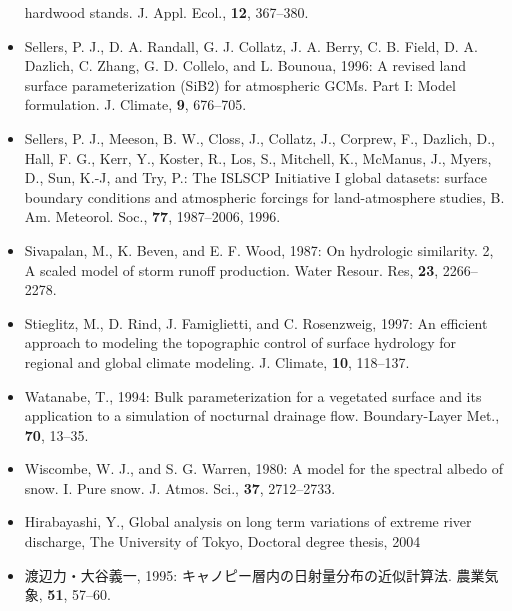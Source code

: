 \begin{itemize}
  hardwood stands. {J. Appl. Ecol.}, {\textbf{12}}, 367--380.
\item
  Sellers, P. J., D. A. Randall, G. J. Collatz, J. A. Berry, C. B. Field, D. A. Dazlich, C. Zhang, G. D. Collelo, and L. Bounoua, 1996: A revised land surface parameterization (SiB2) for atmospheric
  GCMs. Part I: Model formulation. {J. Climate}, {\textbf{9}}, 676--705.
\item
  Sellers, P. J., Meeson, B. W., Closs, J., Collatz, J., Corprew, F., Dazlich, D., Hall, F. G., Kerr, Y., Koster, R., Los, S., Mitchell, K., McManus, J., Myers, D., Sun, K.-J, and Try, P.: The ISLSCP
  Initiative I global datasets: surface boundary conditions and atmospheric forcings for land-atmosphere studies, B. Am. Meteorol. Soc., {\textbf{77}}, 1987--2006, 1996.
\item
  Sivapalan, M., K. Beven, and E. F. Wood, 1987: On hydrologic similarity. 2, A scaled model of storm runoff production. {Water Resour. Res}, {\textbf{23}}, 2266--2278.
\item
  Stieglitz, M., D. Rind, J. Famiglietti, and C. Rosenzweig, 1997: An efficient approach to modeling the topographic control of surface hydrology for regional and global climate modeling. {J.
  Climate}, {\textbf{10}}, 118--137.
\item
  Watanabe, T., 1994: Bulk parameterization for a vegetated surface and its application to a simulation of nocturnal drainage flow. {Boundary-Layer Met.}, {\textbf{70}}, 13--35.
\item
  Wiscombe, W. J., and S. G. Warren, 1980: A model for the spectral albedo of snow. I. Pure snow. {J. Atmos. Sci.}, {\textbf{37}}, 2712--2733.
\item
  Hirabayashi, Y., Global analysis on long term variations of extreme river discharge, The University of Tokyo, Doctoral degree thesis, 2004
\item
  渡辺力・大谷義一, 1995: キャノピー層内の日射量分布の近似計算法. {農業気象}, {\textbf{51}}, 57--60.
\end{itemize}
